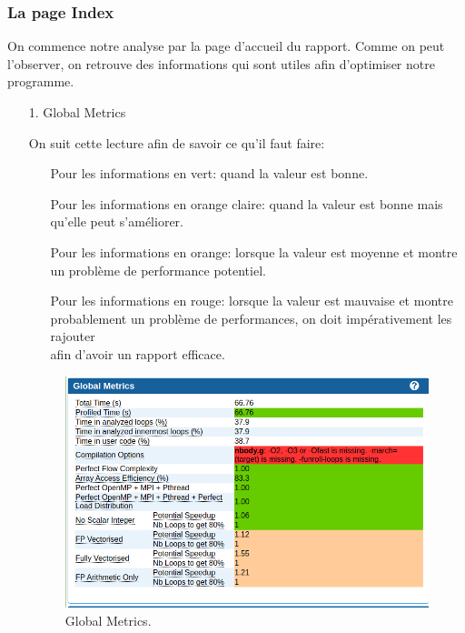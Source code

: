 \documentclass[a4paper, 12pt, twoside]{article}
\begin{document}
\subsubsection*{La page Index}
    
    On commence notre analyse par la page d'accueil du rapport. Comme on peut l'observer, on retrouve des informations qui sont utiles afin d'optimiser notre programme.
    \begin{enumerate}
        \item[1.]Global Metrics
        
         On suit cette lecture afin de savoir ce qu'il faut faire: 
    \begin{enumerate}
        \item[\textbullet]Pour les informations en vert: quand la valeur est bonne.
        \item[\textbullet] Pour les informations en orange claire: quand la valeur est bonne mais qu'elle peut s'améliorer.
        \item[\textbullet]Pour les informations en orange: lorsque la valeur est moyenne et montre un problème de performance potentiel.
        \item[\textbullet]Pour les informations en rouge: lorsque la valeur est mauvaise et montre probablement un problème de performances, on doit impérativement les rajouter\\ afin d'avoir un rapport efficace.
    \end{enumerate}
    
    
    \begin{figure}[h]
    \centering
    \includegraphics[width=\textwidth]{Figures/cap1.png}
    \caption{Global Metrics.}
    

\end{figure}
\end{enumerate}
\end{document}
